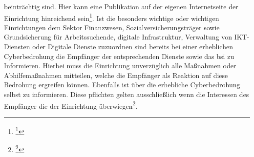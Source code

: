 \documentclass[11pt,a4paper,hidelinks]{article}   %
\begin{document}
beinträchtig sind. Hier kann eine Publikation auf der eigenen Internetseite der Einrichtung hinreichend sein\footnote{\footcite[Vgl.][, §35, Absatz 1]{NIS2UmsuCG}}. Ist die besonders wichtige oder wichtigen Einrichtungen dem Sektor Finanzwesen, Sozialversicherungsträger sowie Grundsicherung für Arbeitssuchende, digitale Infrastruktur, Verwaltung von IKT-Diensten oder Digitale Dienste zuzuordnen sind bereits bei einer erheblichen Cyberbedrohung die Empfänger der entsprechenden Dienste sowie das \gls{bsi} zu Informieren. Hierbei muss die Einrichtung unverzüglich alle Maßnahmen oder Abhilfemaßnahmen mitteilen, welche die Empfänger als Reaktion auf diese Bedrohung ergreifen können. Ebenfalls ist über die erhebliche Cyberbedrohung selbst zu informieren. Diese pflichten gelten ausschließlich wenn die Interessen des Empfänger die der Einrichtung überwiegen\footnote{\footcite[Vgl.][, §35, Absatz 2]{NIS2UmsuCG}}.
\end{document}
